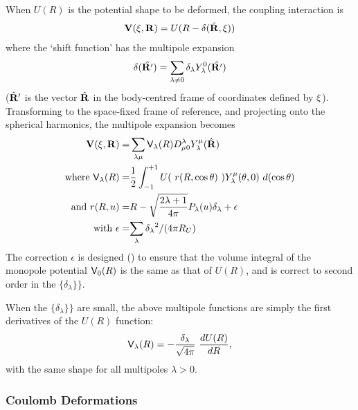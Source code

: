 \documentclass[11pt,a4paper]{article}
\newcommand{\vecR}{{\bf R}}
\newcommand{\Vee}{{\sf V}}
\newcommand{\half}{\frac{1}{2}}
\begin{document}
When $U(R)$ is the potential shape to be deformed,
the coupling interaction is
\begin{eqnarray}
 {\bf V}( {\bf \xi} , \vecR) = U(R - \delta( \hat\vecR ,  {\bf \xi} ))
\end{eqnarray}
where the `shift function' has the multipole expansion
\begin{eqnarray}
 \delta( \hat{\vecR'}) = \sum_{\lambda \neq 0}  \delta_\lambda
         Y^0_\lambda (\hat{\vecR'})
\end{eqnarray}
($\hat \vecR' $ is the vector $ \hat\vecR$ in the
body-centred frame of coordinates defined by $ {\bf \xi} $).
Transforming to the space-fixed frame of reference,
and projecting onto the spherical harmonics,
the multipole expansion becomes
\begin{eqnarray}
 {\bf V}( {\bf \xi} , \vecR) =
   & \sum_{\lambda \mu} \Vee_\lambda (R) D^\lambda_{\mu 0}
         Y^\mu_\lambda (\hat\vecR )
\\
 \mbox{where }  \Vee_\lambda (R) =&\half \int _{-1}^{+1}
                U(~r(R,\cos \theta)~) Y_\lambda^\mu (\theta ,0) ~d(\cos \theta)
\\
 \mbox{and } r(R,u) = &R - \sqrt{ {2 \lambda+1 \over 4 \pi} } P_\lambda (u) \delta_\lambda
                        + \epsilon
\\
 \mbox{with }  \epsilon = &{\sum _ \lambda {\delta_\lambda}^2} / (4 \pi R_U )
\end{eqnarray}
The correction $\epsilon$ is designed (\cite{Sturm})
to ensure that the volume integral of the monopole potential
$\Vee_0 (R)$ is the same as that of $U(R)$, and is correct
to second order in the $\{\delta_\lambda\}\}$.

When the $\{\delta_\lambda\}\}$ are small, the above multipole functions
are simply the first derivatives of the $U(R)$ function:
\begin{eqnarray}
\Vee_\lambda (R) = - {\delta_\lambda \over \sqrt {4 \pi}} ~{dU(R) \over dR} ,
\end{eqnarray}
with the same shape for all multipoles $\lambda> 0$.
\subsubsection{Coulomb Deformations}
\end{document}
